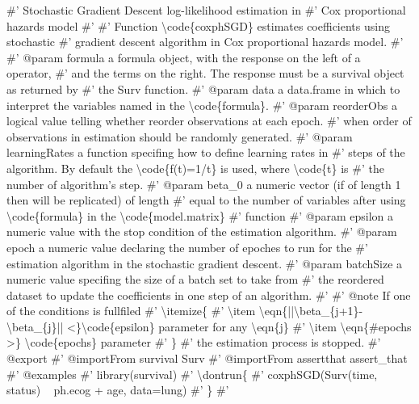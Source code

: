 \documentclass[]{article}
\newenvironment{Shaded}{}{}
\newcommand{\CommentTok}[1]{\textcolor[rgb]{0.00,0.50,0.00}{{#1}}}
\begin{document}
\begin{Shaded}
\begin{Highlighting}[]
\CommentTok{#' Stochastic Gradient Descent log-likelihood estimation in }
\CommentTok{#' Cox proportional hazards model}
\CommentTok{#' }
\CommentTok{#' Function \textbackslash{}code\{coxphSGD\} estimates coefficients using stochastic}
\CommentTok{#' gradient descent algorithm in Cox proportional hazards model.}
\CommentTok{#' }
\CommentTok{#' @param formula a formula object, with the response on the left of a ~ operator,}
\CommentTok{#' and the terms on the right. The response must be a survival object as returned by}
\CommentTok{#' the Surv function.}
\CommentTok{#' @param data a data.frame in which to interpret the variables named in the \textbackslash{}code\{formula\}.}
\CommentTok{#' @param reorderObs a logical value telling whether reorder observations at each epoch.}
\CommentTok{#' when order of observations in estimation should be randomly generated.}
\CommentTok{#' @param learningRates a function specifing how to define learning rates in }
\CommentTok{#' steps of the algorithm. By default the \textbackslash{}code\{f(t)=1/t\} is used, where \textbackslash{}code\{t\} is}
\CommentTok{#' the number of algorithm's step.}
\CommentTok{#' @param beta_0 a numeric vector (if of length 1 then will be replicated) of length }
\CommentTok{#' equal to the number of variables after using \textbackslash{}code\{formula\} in the \textbackslash{}code\{model.matrix\}}
\CommentTok{#' function}
\CommentTok{#' @param epsilon a numeric value with the stop condition of the estimation algorithm. }
\CommentTok{#' @param epoch a numeric value declaring the number of epoches to run for the}
\CommentTok{#' estimation algorithm in the stochastic gradient descent.}
\CommentTok{#' @param batchSize a numeric value specifing the size of a batch set to take from }
\CommentTok{#' the reordered dataset to update the coefficients in one step of an algorithm.}
\CommentTok{#'}
\CommentTok{#' @note If one of the conditions is fullfiled}
\CommentTok{#' \textbackslash{}itemize\{}
\CommentTok{#'  \textbackslash{}item \textbackslash{}eqn\{||\textbackslash{}beta_\{j+1\}-\textbackslash{}beta_\{j\}|| <\}\textbackslash{}code\{epsilon\} parameter for any \textbackslash{}eqn\{j\}}
\CommentTok{#'  \textbackslash{}item \textbackslash{}eqn\{#epochs >\} \textbackslash{}code\{epochs\} parameter}
\CommentTok{#' \}}
\CommentTok{#' the estimation process is stopped.}
\CommentTok{#' @export}
\CommentTok{#' @importFrom survival Surv}
\CommentTok{#' @importFrom assertthat assert_that}
\CommentTok{#' @examples}
\CommentTok{#' library(survival)}
\CommentTok{#' \textbackslash{}dontrun\{}
\CommentTok{#' coxphSGD(Surv(time, status) ~ ph.ecog + age, data=lung)}
\CommentTok{#' \}}
\CommentTok{#' }
\end{Highlighting}
\end{Shaded}
\end{document}
